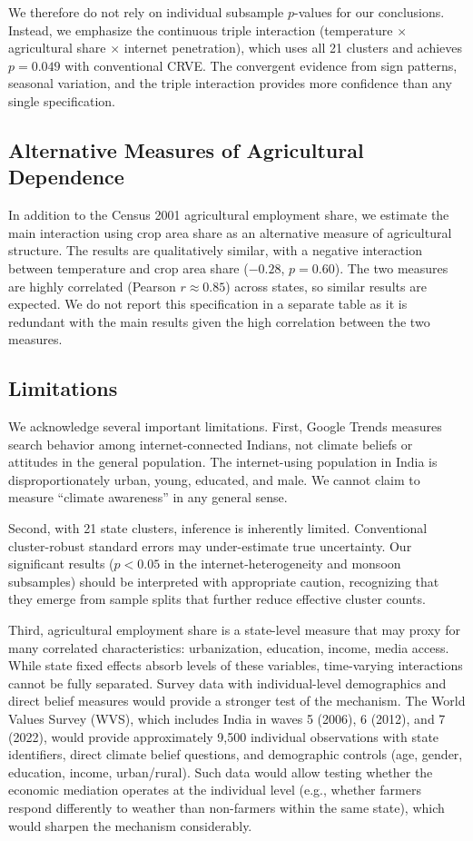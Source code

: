 \documentclass[12pt]{article}
\begin{document}
We therefore do not rely on individual subsample $p$-values for our conclusions. Instead, we emphasize the continuous triple interaction (temperature $\times$ agricultural share $\times$ internet penetration), which uses all 21 clusters and achieves $p = 0.049$ with conventional CRVE. The convergent evidence from sign patterns, seasonal variation, and the triple interaction provides more confidence than any single specification.

\subsection{Alternative Measures of Agricultural Dependence}

In addition to the Census 2001 agricultural employment share, we estimate the main interaction using crop area share as an alternative measure of agricultural structure. The results are qualitatively similar, with a negative interaction between temperature and crop area share ($-0.28$, $p = 0.60$). The two measures are highly correlated (Pearson $r \approx 0.85$) across states, so similar results are expected. We do not report this specification in a separate table as it is redundant with the main results given the high correlation between the two measures.

\subsection{Limitations}

We acknowledge several important limitations. First, Google Trends measures search behavior among internet-connected Indians, not climate beliefs or attitudes in the general population. The internet-using population in India is disproportionately urban, young, educated, and male. We cannot claim to measure ``climate awareness'' in any general sense.

Second, with 21 state clusters, inference is inherently limited. Conventional cluster-robust standard errors may under-estimate true uncertainty. Our significant results ($p < 0.05$ in the internet-heterogeneity and monsoon subsamples) should be interpreted with appropriate caution, recognizing that they emerge from sample splits that further reduce effective cluster counts.

Third, agricultural employment share is a state-level measure that may proxy for many correlated characteristics: urbanization, education, income, media access. While state fixed effects absorb levels of these variables, time-varying interactions cannot be fully separated. Survey data with individual-level demographics and direct belief measures would provide a stronger test of the mechanism. The World Values Survey (WVS), which includes India in waves 5 (2006), 6 (2012), and 7 (2022), would provide approximately 9,500 individual observations with state identifiers, direct climate belief questions, and demographic controls (age, gender, education, income, urban/rural). Such data would allow testing whether the economic mediation operates at the individual level (e.g., whether farmers respond differently to weather than non-farmers within the same state), which would sharpen the mechanism considerably.
\end{document}
